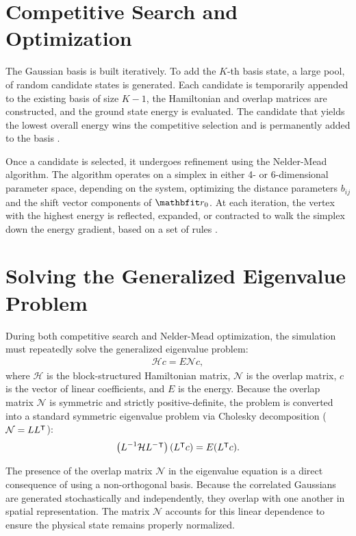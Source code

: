 \documentclass[a4paper,oneside,article,12pt]{memoir}
\begin{document}
\section{Competitive Search and Optimization}
The Gaussian basis is built iteratively. To add the $K$-th basis state, a large pool, of random candidate states is generated. Each candidate is temporarily appended to the existing basis of size $K-1$, the Hamiltonian and overlap matrices are constructed, and the ground state energy is evaluated. The candidate that yields the lowest overall energy wins the competitive selection and is permanently added to the basis \cite{SVM}.

Once a candidate is selected, it undergoes refinement using the Nelder-Mead algorithm. The algorithm operates on a simplex in either 4- or 6-dimensional parameter space, depending on the system, optimizing the distance parameters $b_{ij}$ and the shift vector components of $\v{r_0}$. At each iteration, the vertex with the highest energy is reflected, expanded, or contracted to walk the simplex down the energy gradient, based on a set of rules \cite{NM}. 

\section{Solving the Generalized Eigenvalue Problem} \label{ch:comp_eigenvalue}
During both competitive search and Nelder-Mead optimization, the simulation must repeatedly solve the generalized eigenvalue problem:
\begin{align}
    \mathcal{H}c = E \mathcal{N} c,
\end{align}
where $\mathcal{H}$ is the block-structured Hamiltonian matrix, $\mathcal{N}$ is the overlap matrix, $c$ is the vector of linear coefficients, and $E$ is the energy. Because the overlap matrix $\mathcal{N}$ is symmetric and strictly positive-definite, the problem is converted into a standard symmetric eigenvalue problem via Cholesky decomposition ($\mathcal{N} = L L\tr$):
\begin{align}
    \br{L^{-1} \mathcal{H} L^{-}\tr} (L\tr c) = E (L\tr c).
\end{align}

The presence of the overlap matrix $\mathcal{N}$ in the eigenvalue equation is a direct consequence of using a non-orthogonal basis. Because the correlated Gaussians are generated stochastically and independently, they overlap with one another in spatial representation. The matrix $\mathcal{N}$ accounts for this linear dependence to ensure the physical state remains properly normalized. 
\end{document}
